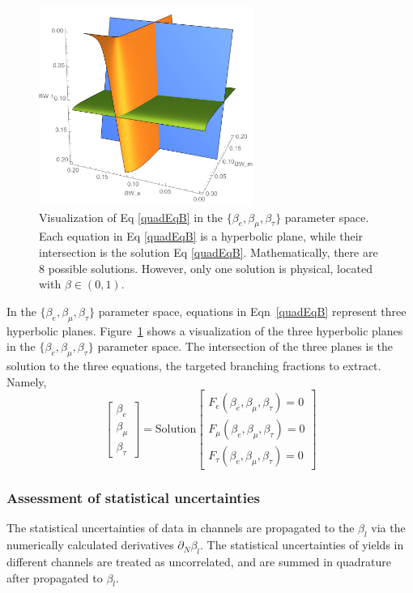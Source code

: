 \begin{figure}[ht]
    \centering
    \includegraphics[width=7cm]{chapters/Analysis/sectionStatisticalAnalysis/figures/visual.png}
    \caption{ Visualization of Eq \ref{quadEqB} in the
    $\{\beta_{e},\beta_{\mu},\beta_{\tau}\}$ parameter space. Each
    equation in Eq \ref{quadEqB} is a hyperbolic plane, while their
    intersection is the solution Eq \ref{quadEqB}. Mathematically, there
    are 8 possible solutions. However, only one solution is physical,
    located with $\beta \in (0,1) $. }
    \label{fig:visualize}
\end{figure}


In the $\{\beta_{e},\beta_{\mu},\beta_{\tau}\}$ parameter space, 
equations in Eqn~\ref{quadEqB} represent three hyperbolic planes.
Figure~\ref{fig:visualize} shows a visualization of the three hyperbolic planes 
in the $\{\beta_{e},\beta_{\mu},\beta_{\tau}\}$ parameter space. 
The intersection of the three planes is the solution to the three equations, 
the targeted branching fractions to extract. Namely,
% 
\begin{equation} 
    \begin{bmatrix} 
        \beta_e \\ 
        \beta_\mu \\ 
        \beta_\tau 
    \end{bmatrix}
    = \text{Solution}
    \begin{bmatrix}
	    F_e    (\beta_e,\beta_\mu,\beta_\tau) = 0 \\
	    F_\mu  (\beta_e,\beta_\mu,\beta_\tau) = 0 \\
	    F_\tau (\beta_e,\beta_\mu,\beta_\tau) = 0
    \end{bmatrix}
\end{equation}



\subsubsection{Assessment of statistical uncertainties}
The statistical uncertainties of data in channels are propagated to the $\beta_l$ 
via the numerically calculated derivatives $\partial_{N} \beta_l$. 
The statistical uncertainties of yields in different channels are treated as uncorrelated, 
and are summed in quadrature after propagated to $\beta_l$.

